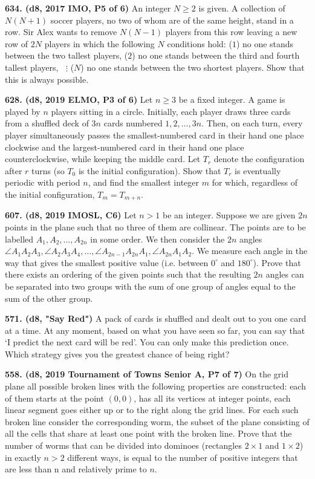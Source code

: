 \documentclass{article}
\begin{document}
\textbf{634. (\color{red}d8\color{black}, 2017 IMO, P5 of 6)} An integer $N \ge 2$ is given. A collection of $N(N + 1)$ soccer players, no two of whom are of the same height, stand in a row. Sir Alex wants to remove $N(N - 1)$ players from this row leaving a new row of $2N$ players in which the following $N$ conditions hold:
\smallbreak
($1$) no one stands between the two tallest players,
\smallbreak
($2$) no one stands between the third and fourth tallest players,
\smallbreak
$\;\;\vdots$
\smallbreak
($N$) no one stands between the two shortest players.
\bigbreak
Show that this is always possible.

\textbf{628. (\color{red}d8\color{black}, 2019 ELMO, P3 of 6)} Let $n \ge 3$ be a fixed integer. A game is played by $n$ players sitting in a circle. Initially, each player draws three cards from a shuffled deck of $3n$ cards numbered $1, 2, \dots, 3n$. Then, on each turn, every player simultaneously passes the smallest-numbered card in their hand one place clockwise and the largest-numbered card in their hand one place counterclockwise, while keeping the middle card.
\bigbreak
Let $T_r$ denote the configuration after $r$ turns (so $T_0$ is the initial configuration). Show that $T_r$ is eventually periodic with period $n$, and find the smallest integer $m$ for which, regardless of the initial configuration, $T_m=T_{m+n}$.

\textbf{607. (\color{red}d8\color{black}, 2019 IMOSL, C6)} Let $n>1$ be an integer. Suppose we are given $2n$ points in the plane such that no three of them are collinear. The points are to be labelled $A_1, A_2, \dots , A_{2n}$ in some order. We then consider the $2n$ angles $\angle A_1A_2A_3, \angle A_2A_3A_4, \dots, \angle A_{2n-1}A_{2n}A_1, \angle A_{2n}A_1A_2$. We measure each angle in the way that gives the smallest positive value (i.e. between $0^{\circ}$ and $180^{\circ}$). Prove that there exists an ordering of the given points such that the resulting $2n$ angles can be separated into two groups with the sum of one group of angles equal to the sum of the other group.

\textbf{571. (\color{red}d8\color{black}, "Say Red")} A pack of cards is shuffled and dealt out to you one card at a time. At any moment, based on what you have seen so far, you can say that `I predict the next card will be red'. You can only make this prediction once. Which strategy gives you the greatest chance of being right?

\textbf{558. (\color{red}d8\color{black}, 2019 Tournament of Towns Senior A, P7 of 7)} On the grid plane all possible broken lines with the following properties are constructed:
each of them starts at the point $(0, 0)$, has all its vertices at integer points, each linear segment goes either up or to the right along the grid lines. For each such broken line consider the corresponding worm, the subset of the plane consisting of all the cells that share at least one point with the broken line. Prove that the number of worms that can be divided into dominoes (rectangles $2\times 1$ and $1\times 2$) in exactly $n > 2$ different ways, is equal to the number of positive integers that are less than n and relatively prime to $n$.
\end{document}
